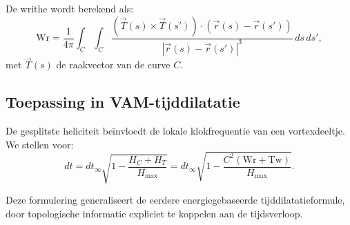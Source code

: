 De writhe wordt berekend als:
\begin{equation}
    \text{Wr} = \frac{1}{4\pi} \int_C \int_C \frac{\left(\vec{T}(s) \times \vec{T}(s')\right) \cdot \left(\vec{r}(s) - \vec{r}(s')\right)}{|\vec{r}(s) - \vec{r}(s')|^3} \, ds \, ds',
\end{equation}
met $\vec{T}(s)$ de raakvector van de curve $C$.

\subsection{Toepassing in VAM-tijddilatatie}

De gesplitste heliciteit beïnvloedt de lokale klokfrequentie van een vortexdeeltje. We stellen voor:
\begin{equation}
    dt = dt_\infty \sqrt{1 - \frac{H_C + H_T}{H_\text{max}}} = dt_\infty \sqrt{1 - \frac{C^2 (\text{Wr} + \text{Tw})}{H_\text{max}}}.
\end{equation}

Deze formulering generaliseert de eerdere energiegebaseerde tijddilatatieformule, door topologische informatie expliciet te koppelen aan de tijdsverloop.